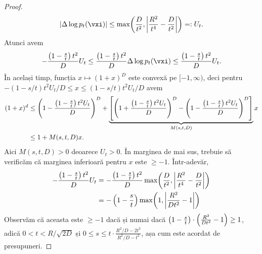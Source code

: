 \documentclass[../../book-main_ro.tex]{subfiles}
\begin{document}
\begin{proof}
\begin{equation}
        \abs{\Delta \log p_{t}(\vxi)} \leq \max\rp{\frac{D}{t^{2}}, \abs*{\frac{R^{2}}{t^{4}} - \frac{D}{t^{2}}}} =: U_{t}.
    \end{equation}
    Atunci avem
    \begin{equation}
        -\frac{\bp{1 - \frac{s}{t}}t^{2}}{D}U_{t} \leq \frac{\bp{1 - \frac{s}{t}}t^{2}}{D}\Delta \log p_{t}(\vxi) \leq \frac{\bp{1 - \frac{s}{t}}t^{2}}{D}U_{t}.
    \end{equation}
    În același timp, funcția \(x \mapsto (1 + x)^{D}\) este convexă pe \([-1, \infty)\), deci pentru
    \(-(1-s/t)t^{2}U_{t}/D \leq x \leq (1-s/t)t^{2}U_{t}/D\) avem 
    \begin{align}
        (1 + x)^{d} 
        &\leq \left(1 - \frac{\left(1 - \frac{s}{t}\right)t^{2}U_{t}}{D}\right)^{D} + \underbrace{\left[\left(1 + \frac{\left(1 - \frac{s}{t}\right)t^{2}U_{t}}{D}\right)^{D} - \left(1 - \frac{\left(1 - \frac{s}{t}\right)t^{2}U_{t}}{D}\right)^{D}\right]}_{M(s, t, D)}x \\ 
        &\leq 1 + M(s, t, D)x.
    \end{align}
    Aici \(M(s, t, D) > 0\) deoarece \(U_{t} > 0\). În marginea de mai sus, trebuie să verificăm că marginea inferioară pentru \(x\) este \(\geq -1\). Într-adevăr,
    \begin{align}
        -\frac{\bp{1 - \frac{s}{t}}t^{2}}{D}U_{t}
        &= -\frac{\bp{1 - \frac{s}{t}}t^{2}}{D}\max\rp{\frac{D}{t^{2}}, \abs*{\frac{R^{2}}{t^{4}} - \frac{D}{t^{2}}}} \\ 
        &= -\bp{1 - \frac{s}{t}}\max\rp{1, \abs*{\frac{R^{2}}{Dt^{2}} - 1}}
    \end{align}
    Observăm că aceasta este \(\geq -1\) dacă și numai dacă \(\left(1 - \frac{s}{t}\right)\cdot\left(\frac{R^{2}}{Dt^{2}} - 1\right) \geq 1\), adică \(0 < t < R/\sqrt{2D}\) și \(0 \leq s \leq t\cdot\frac{R^{2}/D - 2t^{2}}{R^{2}/D - t^{2}}\), așa cum este acordat de presupuneri.
    

\end{proof}
\end{document}
